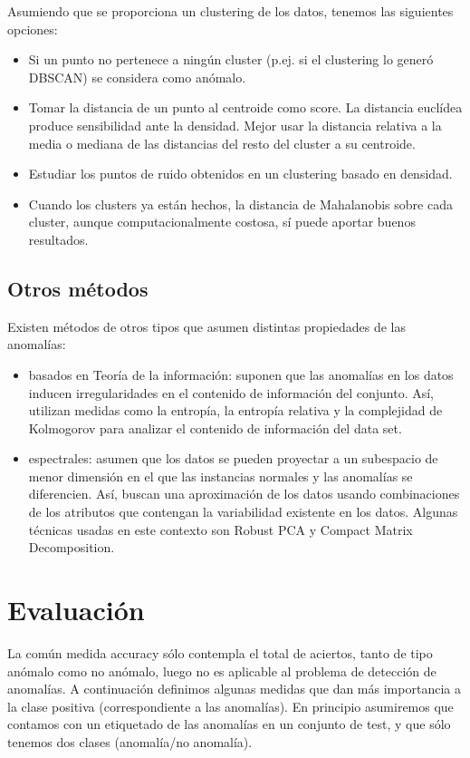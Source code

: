 \documentclass[a4paper,11pt,spanish]{report}
\let\stdsection\section
\let\stdsub\subsection
\let\stdsubsub\subsubsection
\renewcommand{\chapter}{\stdsection}
\renewcommand{\section}{\stdsub}
\renewcommand{\subsection}{\stdsubsub}
\begin{document}
Asumiendo que se proporciona un clustering de los datos, tenemos las siguientes opciones:

\begin{itemize}
\item Si un punto no pertenece a ningún cluster (p.ej. si el clustering lo generó DBSCAN) se considera como anómalo.
\item Tomar la distancia de un punto al centroide como score. La distancia euclídea produce sensibilidad ante la densidad. Mejor usar la distancia relativa a la media o mediana de las distancias del resto del cluster a su centroide.
\item Estudiar los puntos de ruido obtenidos en un clustering basado en densidad.
\item Cuando los clusters ya están hechos, la distancia de Mahalanobis sobre cada cluster, aunque computacionalmente costosa, sí puede aportar buenos resultados.
\end{itemize}

\section{Otros métodos}
\label{sec-2-4-4}

Existen métodos de otros tipos que asumen distintas propiedades de las anomalías:

\begin{itemize}
\item basados en Teoría de la información: suponen que las anomalías en los datos inducen irregularidades en el contenido de información del conjunto. Así, utilizan medidas como la entropía, la entropía relativa y la complejidad de Kolmogorov para analizar el contenido de información del data set.
\item espectrales: asumen que los datos se pueden proyectar a un subespacio de menor dimensión en el que las instancias normales y las anomalías se diferencien. Así, buscan una aproximación de los datos usando combinaciones de los atributos que contengan la variabilidad existente en los datos. Algunas técnicas usadas en este contexto son Robust PCA y Compact Matrix Decomposition.
\end{itemize}

\chapter{Evaluación}
\label{sec-2-5}

La común medida accuracy sólo contempla el total de aciertos, tanto de tipo anómalo como no anómalo, luego no es aplicable al problema de detección de anomalías. A continuación definimos algunas medidas que dan más importancia a la clase positiva (correspondiente a las anomalías). En principio asumiremos que contamos con un etiquetado de las anomalías en un conjunto de test, y que sólo tenemos dos clases (anomalía/no anomalía).
\end{document}
